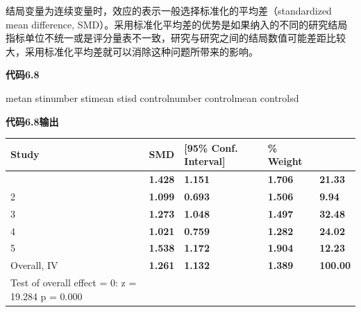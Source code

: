 \documentclass[
  chinese-hans,
  letterpaper,
  DIV=11,
  numbers=noendperiod]{scrreprt}
\newenvironment{Shaded}{\begin{snugshade}}{\end{snugshade}}
\newcommand{\NormalTok}[1]{\textcolor[rgb]{0.00,0.23,0.31}{#1}}
\newcounter{none} %
\begin{document}
结局变量为连续变量时，效应的表示一般选择标准化的平均差（standardized
mean difference,
SMD）。采用标准化平均差的优势是如果纳入的不同的研究结局指标单位不统一或是评分量表不一致，研究与研究之间的结局数值可能差距比较大，采用标准化平均差就可以消除这种问题所带来的影响。

\begin{tcolorbox}[enhanced jigsaw, arc=.35mm, bottomrule=.15mm, breakable, colback=white, colframe=quarto-callout-note-color-frame, left=2mm, leftrule=.75mm, opacityback=0, rightrule=.15mm, toprule=.15mm]

\vspace{-3mm}\textbf{代码6.8}\vspace{3mm}

\begin{Shaded}
\begin{Highlighting}[]
\NormalTok{metan stinumber stimean stisd controlnumber controlmean controlsd}
\end{Highlighting}
\end{Shaded}

\end{tcolorbox}

\begin{tcolorbox}[enhanced jigsaw, arc=.35mm, bottomrule=.15mm, breakable, colback=white, colframe=quarto-callout-note-color-frame, left=2mm, leftrule=.75mm, opacityback=0, rightrule=.15mm, toprule=.15mm]

\vspace{-3mm}\textbf{代码6.8输出}\vspace{3mm}

{\def\LTcaptype{none} %
\begin{longtable}[]{@{}lllll@{}}
\toprule\noalign{}
Study & SMD & {[}95\% Conf. Interval{]} & \% Weight & \\
\midrule\noalign{}
\endhead
\bottomrule\noalign{}
\endlastfoot
1 & \textbf{1.428} & \textbf{1.151} & \textbf{1.706} & \textbf{21.33} \\
2 & \textbf{1.099} & \textbf{0.693} & \textbf{1.506} & \textbf{9.94} \\
3 & \textbf{1.273} & \textbf{1.048} & \textbf{1.497} & \textbf{32.48} \\
4 & \textbf{1.021} & \textbf{0.759} & \textbf{1.282} & \textbf{24.02} \\
5 & \textbf{1.538} & \textbf{1.172} & \textbf{1.904} & \textbf{12.23} \\
Overall, IV & \textbf{1.261} & \textbf{1.132} & \textbf{1.389} &
\textbf{100.00} \\
Test of overall effect = 0: z = 19.284 p = 0.000 & & & & \\
\end{longtable}
}

\end{tcolorbox}
\end{document}
